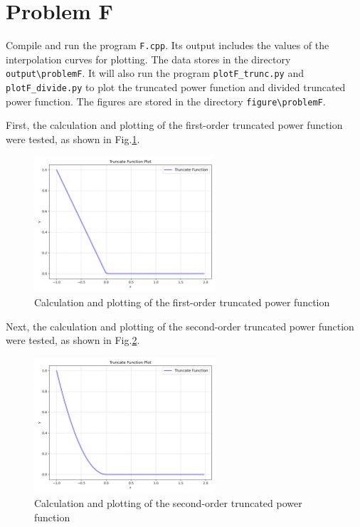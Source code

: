 \documentclass[a4paper]{article}
\begin{document}
\begin{sloppypar}
\section*{Problem F}
Compile and run the program \verb|F.cpp|. Its output includes the values of the interpolation curves for plotting. The data stores in the directory \verb|output\problemF|.
It will also run the program \verb|plotF_trunc.py| and \verb|plotF_divide.py| to plot the truncated power function and divided truncated power function. The figures are stored in the directory \verb|figure\problemF|.

First, the calculation and plotting of the first-order truncated power function
were tested, as shown in Fig.\ref{fig:trunc_power_1}.
\begin{figure}[H]
  \centering
  \includegraphics[width=0.6\textwidth]{../figure/problemF/trunc_1.png}
  \renewcommand{\figurename}{Fig.}
  \caption{Calculation and plotting of the first-order truncated power function}
  \label{fig:trunc_power_1}
\end{figure}

Next, the calculation and plotting of the second-order truncated power function
were tested, as shown in Fig.\ref{fig:trunc_power_2}.
\begin{figure}[H]
  \centering
  \includegraphics[width=0.6\textwidth]{../figure/problemF/trunc_2.png}
  \renewcommand{\figurename}{Fig.}
  \caption{Calculation and plotting of the second-order truncated power function}
  \label{fig:trunc_power_2}
\end{figure}


\end{sloppypar}
\end{document}
